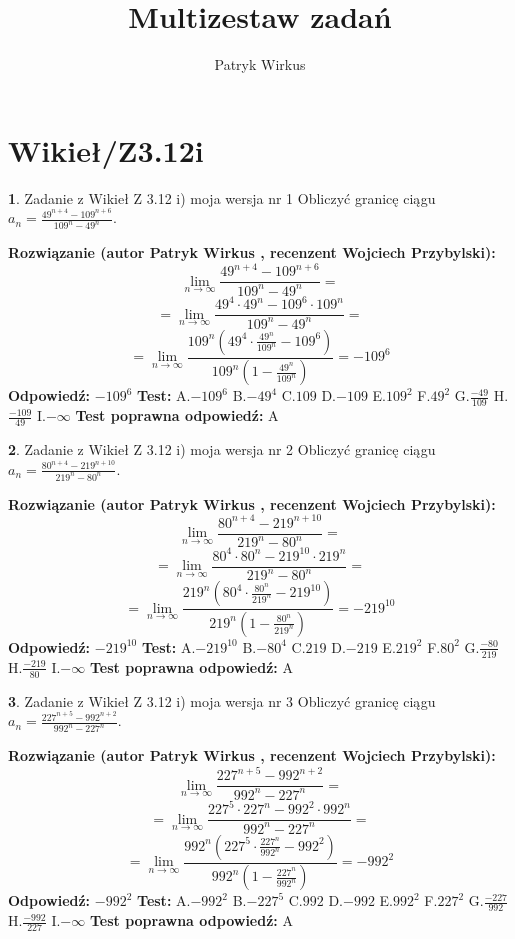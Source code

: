 \documentclass[12pt, a4paper]{article}
\title{Multizestaw zadań}
\author{Patryk Wirkus}
\date{}
\theoremstyle{definition} %
\newtheorem{zad}{}
\newcommand{\kategoria}[1]{\section{#1}}
\newcommand{\zadStart}[1]{\begin{zad}#1\newline}
\newcommand{\zadStop}{\end{zad}}
\newcommand{\rozwStart}[2]{\noindent \textbf{Rozwiązanie (autor #1 , recenzent #2): }\newline}
\newcommand{\rozwStop}{\newline}
\newcommand{\odpStart}{\noindent \textbf{Odpowiedź:}\newline}
\newcommand{\odpStop}{\newline}
\newcommand{\testStart}{\noindent \textbf{Test:}\newline}
\newcommand{\testStop}{\newline}
\newcommand{\kluczStart}{\noindent \textbf{Test poprawna odpowiedź:}\newline}
\newcommand{\kluczStop}{\newline}
\begin{document}
\maketitle

\kategoria{Wikieł/Z3.12i}


\zadStart{Zadanie z Wikieł Z 3.12 i) moja wersja nr 1}
Obliczyć granicę ciągu $a_{n}=\frac{49^{n+4} - 109^{n+6}}{109^{n}-49^{n}}$.
\zadStop
\rozwStart{Patryk Wirkus}{Wojciech Przybylski}
$$\lim\limits_{n\to\infty}\frac{49^{n+4} - 109^{n+6}}{109^{n}-49^{n}}=$$
$$= \lim\limits_{n\to\infty}\frac{49^{4} \cdot 49^{n} - 109^{6} \cdot 109^{n}}{109^{n}-49^{n}}=$$
$$= \lim\limits_{n\to\infty}\frac{109^{n}(49^{4} \cdot \frac{49^{n}}{109^{n}} - 109^{6})}{109^{n}(1-\frac{49^{n}}{109^{n}})} = -109^{6}$$
\rozwStop
\odpStart
$-109^{6}$
\odpStop
\testStart
A.$-109^{6}$
B.$-49^{4}$
C.$109$
D.$-109$
E.$109^{2}$
F.$49^{2}$
G.$\frac{-49}{109}$
H.$\frac{-109}{49}$
I.$-\infty$
\testStop
\kluczStart
A
\kluczStop



\zadStart{Zadanie z Wikieł Z 3.12 i) moja wersja nr 2}
Obliczyć granicę ciągu $a_{n}=\frac{80^{n+4} - 219^{n+10}}{219^{n}-80^{n}}$.
\zadStop
\rozwStart{Patryk Wirkus}{Wojciech Przybylski}
$$\lim\limits_{n\to\infty}\frac{80^{n+4} - 219^{n+10}}{219^{n}-80^{n}}=$$
$$= \lim\limits_{n\to\infty}\frac{80^{4} \cdot 80^{n} - 219^{10} \cdot 219^{n}}{219^{n}-80^{n}}=$$
$$= \lim\limits_{n\to\infty}\frac{219^{n}(80^{4} \cdot \frac{80^{n}}{219^{n}} - 219^{10})}{219^{n}(1-\frac{80^{n}}{219^{n}})} = -219^{10}$$
\rozwStop
\odpStart
$-219^{10}$
\odpStop
\testStart
A.$-219^{10}$
B.$-80^{4}$
C.$219$
D.$-219$
E.$219^{2}$
F.$80^{2}$
G.$\frac{-80}{219}$
H.$\frac{-219}{80}$
I.$-\infty$
\testStop
\kluczStart
A
\kluczStop



\zadStart{Zadanie z Wikieł Z 3.12 i) moja wersja nr 3}
Obliczyć granicę ciągu $a_{n}=\frac{227^{n+5} - 992^{n+2}}{992^{n}-227^{n}}$.
\zadStop
\rozwStart{Patryk Wirkus}{Wojciech Przybylski}
$$\lim\limits_{n\to\infty}\frac{227^{n+5} - 992^{n+2}}{992^{n}-227^{n}}=$$
$$= \lim\limits_{n\to\infty}\frac{227^{5} \cdot 227^{n} - 992^{2} \cdot 992^{n}}{992^{n}-227^{n}}=$$
$$= \lim\limits_{n\to\infty}\frac{992^{n}(227^{5} \cdot \frac{227^{n}}{992^{n}} - 992^{2})}{992^{n}(1-\frac{227^{n}}{992^{n}})} = -992^{2}$$
\rozwStop
\odpStart
$-992^{2}$
\odpStop
\testStart
A.$-992^{2}$
B.$-227^{5}$
C.$992$
D.$-992$
E.$992^{2}$
F.$227^{2}$
G.$\frac{-227}{992}$
H.$\frac{-992}{227}$
I.$-\infty$
\testStop
\kluczStart
A
\kluczStop
\end{document}
